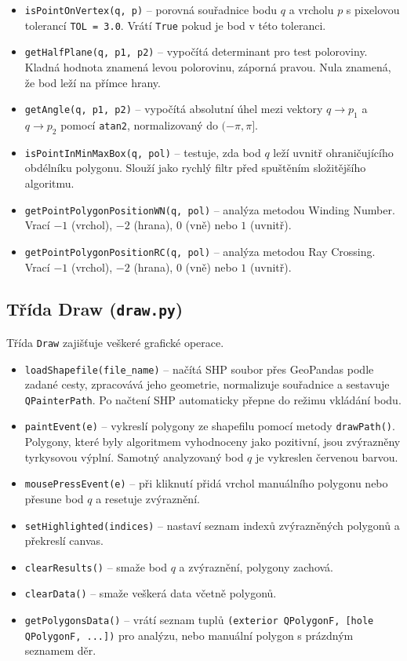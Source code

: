 \documentclass[11pt, a4paper]{article}
\begin{document}
\begin{itemize}
\item \texttt{isPointOnVertex(q, p)} -- porovná souřadnice bodu $q$ a vrcholu $p$ s pixelovou tolerancí \texttt{TOL = 3.0}. Vrátí \texttt{True} pokud je bod v této toleranci.
\item \texttt{getHalfPlane(q, p1, p2)} -- vypočítá determinant pro test poloroviny. Kladná hodnota znamená levou polorovinu, záporná pravou. Nula znamená, že bod leží na přímce hrany.
\item \texttt{getAngle(q, p1, p2)} -- vypočítá absolutní úhel mezi vektory $q \to p_1$ a $q \to p_2$ pomocí \texttt{atan2}, normalizovaný do $(-\pi, \pi]$.
\item \texttt{isPointInMinMaxBox(q, pol)} -- testuje, zda bod $q$ leží uvnitř ohraničujícího obdélníku polygonu. Slouží jako rychlý filtr před spuštěním složitějšího algoritmu.
\item \texttt{getPointPolygonPositionWN(q, pol)} -- analýza metodou Winding Number. Vrací $-1$ (vrchol), $-2$ (hrana), $0$ (vně) nebo $1$ (uvnitř).
\item \texttt{getPointPolygonPositionRC(q, pol)} -- analýza metodou Ray Crossing. Vrací $-1$ (vrchol), $-2$ (hrana), $0$ (vně) nebo $1$ (uvnitř).
\end{itemize}

\newpage
\subsection{Třída Draw (\texttt{draw.py})}
Třída \texttt{Draw} zajišťuje veškeré grafické operace.

\begin{itemize}
\item\texttt{loadShapefile(file\_name)} -- načítá SHP soubor přes GeoPandas podle zadané cesty, zpracovává jeho geometrie, normalizuje souřadnice a sestavuje \texttt{QPainterPath}. Po načtení SHP automaticky přepne do režimu vkládání bodu.
\item \texttt{paintEvent(e)} -- vykreslí polygony ze shapefilu pomocí metody \texttt{drawPath()}. Polygony, které byly algoritmem vyhodnoceny jako pozitivní, jsou zvýrazněny tyrkysovou výplní. Samotný analyzovaný bod $q$ je vykreslen červenou barvou.
\item \texttt{mousePressEvent(e)} -- při kliknutí přidá vrchol manuálního polygonu nebo přesune bod $q$ a resetuje zvýraznění.
\item \texttt{setHighlighted(indices)} -- nastaví seznam indexů zvýrazněných polygonů a překreslí canvas.
\item \texttt{clearResults()} -- smaže bod $q$ a zvýraznění, polygony zachová.
\item \texttt{clearData()} -- smaže veškerá data včetně polygonů.
\item \texttt{getPolygonsData()} -- vrátí seznam tuplů \texttt{(exterior QPolygonF, [hole QPolygonF, ...])} pro analýzu, nebo manuální polygon s prázdným seznamem děr.
\end{itemize}
\end{document}
